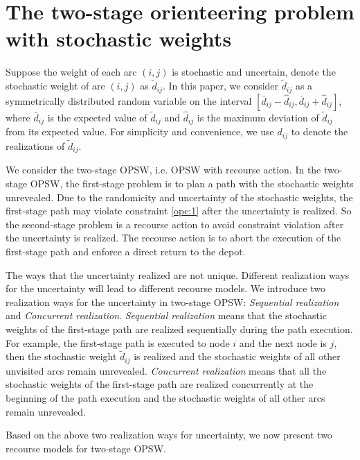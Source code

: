 \documentclass[preprint,review,10pt,round,authoryear]{elsarticle}\usepackage[]{graphicx}\usepackage[]{color}
\theoremstyle{plain}
\theoremstyle{definition}
\theoremstyle{remark}
\begin{document}
\section{The two-stage orienteering problem with stochastic weights}
\label{section:2op}

Suppose the weight of each arc $(i,j)$ is stochastic and uncertain, denote the stochastic weight of arc $(i,j)$ as $\tilde{d}_{ij}$. In this paper, we consider $\tilde{d}_{ij}$ as a symmetrically distributed random variable on the interval $[\bar{d}_{ij}-\hat{d}_{ij},\bar{d}_{ij}+\hat{d}_{ij}]$, where $\bar{d}_{ij}$ is the expected value of $\tilde{d}_{ij}$ and $\hat{d}_{ij}$ is the maximum deviation of $\tilde{d}_{ij}$ from its expected value. For simplicity and convenience, we use $d_{ij}$ to denote the realizations of $\tilde{d}_{ij}$.

We consider the two-stage OPSW, i.e. OPSW with recourse action. In the two-stage OPSW, the first-stage problem is to plan a path with the stochastic weights unrevealed. Due to the randomicity and uncertainty of the stochastic weights, the first-stage path may violate constraint \eqref{opc:1} after the uncertainty is realized. So the second-stage problem is a recourse action to avoid constraint violation after the uncertainty is realized. The recourse action is to abort the execution of the first-stage path and enforce a direct return to the depot.

The ways that the uncertainty realized are not unique. Different realization ways for the uncertainty will lead to different recourse models. We introduce two realization ways for the uncertainty in two-stage OPSW: \emph{Sequential realization} and \emph{Concurrent realization}. \emph{Sequential realization} means that the stochastic weights of the first-stage path are realized sequentially during the path execution. For example, the first-stage path is executed to node $i$ and the next node is $j$, then the stochastic weight $\tilde{d}_{ij}$ is realized and the stochastic weights of all other unvisited arcs remain unrevealed. \emph{Concurrent realization} means that all the stochastic weights of the first-stage path are realized concurrently at the beginning of the path execution and the stochastic weights of all other arcs remain unrevealed.

Based on the above two realization ways for uncertainty, we now present two recourse models for two-stage OPSW.
\end{document}
